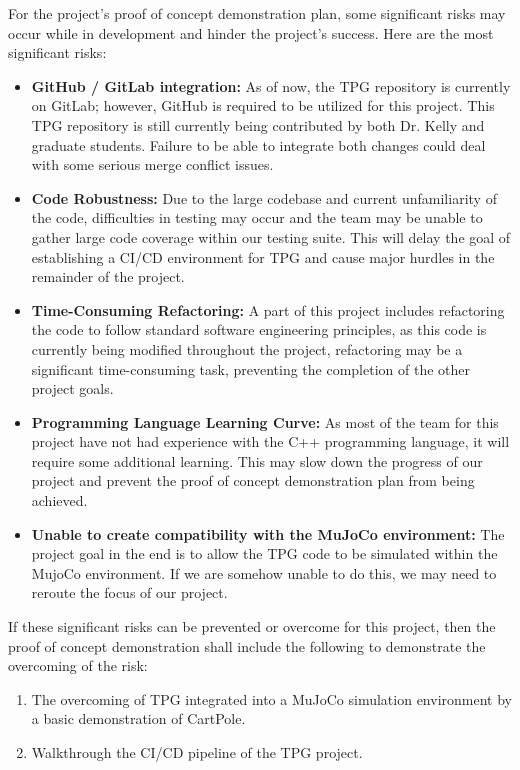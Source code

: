 \documentclass{article}
\begin{document}
For the project's proof of concept demonstration plan, some significant risks may occur while in development and hinder the project's success. Here are the most significant risks:
\begin{itemize}
  \item \textbf{GitHub / GitLab integration:} As of now, the TPG repository is currently on GitLab; however, GitHub is required to be utilized for this project. This TPG repository is still currently being contributed by both Dr. Kelly and graduate students. Failure to be able to integrate both changes could deal with some serious merge conflict issues.
  \item \textbf{Code Robustness:} Due to the large codebase and current unfamiliarity of the code, difficulties in testing may occur and the team may be unable to gather large code coverage within our testing suite. This will delay the goal of establishing a CI/CD environment for TPG and cause major hurdles in the remainder of the project.
  \item \textbf{Time-Consuming Refactoring:} A part of this project includes refactoring the code to follow standard software engineering principles, as this code is currently being modified throughout the project, refactoring may be a significant time-consuming task, preventing the completion of the other project goals.
  \item \textbf{Programming Language Learning Curve:} As most of the team for this project have not had experience with the C++ programming language, it will require some additional learning. This may slow down the progress of our project and prevent the proof of concept demonstration plan from being achieved.
  \item \textbf{Unable to create compatibility with the MuJoCo environment:} The project goal in the end is to allow the TPG code to be simulated within the MujoCo environment. If we are somehow unable to do this, we may need to reroute the focus of our project.
\end{itemize}


\noindent If these significant risks can be prevented or overcome for this project, then the proof of concept demonstration shall include the following to demonstrate the overcoming of the risk: 
\begin{enumerate}
 \item The overcoming of TPG integrated into a MuJoCo simulation environment by a basic demonstration of CartPole. 
 \item Walkthrough the CI/CD pipeline of the TPG project. 
\end{enumerate}
\end{document}
